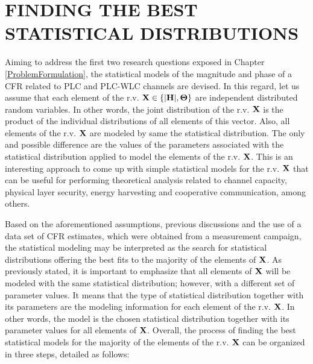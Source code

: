 \section{FINDING THE BEST STATISTICAL DISTRIBUTIONS} \label{sec:P1}

Aiming to address the first two research questions exposed in Chapter \ref{ProblemFormulation}, the statistical models of the magnitude and phase of a \ac{CFR} related to \ac{PLC} and \ac{PLC}-\ac{WLC} channels are devised. In this regard, let us assume that each element of the \ac{r.v.} ${\bf X}\in \{ {\bf |H|},{\bf \Theta} \}$ are independent distributed random variables. In other words, the joint distribution of the \ac{r.v.} ${\bf X}$ is the product of the individual distributions of all elements of this vector. Also, all elements of the \ac{r.v.} ${\bf X}$ are modeled by same the statistical distribution. The only and possible difference are the values of the parameters associated with the statistical distribution applied to model the elements of  the \ac{r.v.} ${\bf X}$. This is an interesting approach to come up with simple statistical models for the \ac{r.v.} ${\bf X}$ that can be useful for performing theoretical analysis related to channel capacity, physical layer security, energy harvesting and cooperative communication, among others.

Based on the aforementioned assumptions, previous discussions and the use of a data set of \ac{CFR} estimates, which were obtained from a measurement campaign, the statistical modeling may be interpreted as the search for statistical distributions offering the best fits to the majority of the elements of ${\bf X}$. As previously stated, it is important to emphasize that all elements of ${\bf X}$ will be modeled with the same statistical distribution; however, with a different set of parameter values. It means that the type of statistical distribution together with its parameters are the modeling information for each element of the \ac{r.v.}  ${\bf X}$. In other words, the model is the chosen statistical distribution together with its parameter values for all elements of ${\bf X}$. Overall, the process of finding the best statistical models for the majority of the elements of the \ac{r.v.} $\bf X$ can be organized in three steps, detailed as follows:

